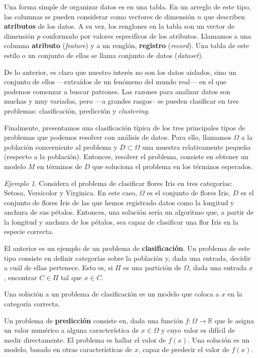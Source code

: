 \documentclass{article}
\numberwithin{equation}{section}
\theoremstyle{remark}
\newtheorem{example}{Ejemplo}
\theoremstyle{definition}
\theoremstyle{remark}
\theoremstyle{remark}
\begin{document}
Una forma simple de organizar datos es en una tabla. En un arreglo de este tipo, las columnas
se pueden considerar como vectores de dimensión $n$ que
describen \textbf{atributos} de los datos. A su vez, los renglones en la tabla 
son un vector de dimensión $p$ conformado por valores especifícos de los atributos. 
Llamamos a una columna \textbf{atributo} (\textit{feature}) y a un renglón, \textbf{registro} (\textit{record}). 
Una tabla de este estilo o un conjunto de ellas se llama conjunto de datos (\textit{dataset}).

De lo anterior, es claro que nuestro interés no son los datos aislados, sino un conjunto de ellos ---extraídos de un
fenómeno del mundo real--- en el que podemos comenzar a buscar patrones. 
Las razones para analizar datos son muchas y muy variadas, pero ---a grandes rasgos-- se pueden clasificar en tres
problemas: clasificación, predicción y \textit{clustering}.

Finalmente, presentamos una clasificación típica de los tres principales tipos de problemas que podemos resolver
con análisis de datos.
Para ello, llamamos $\Omega$ a la población concerniente 
al problema y $D \subset \Omega$ una muestra relativamente pequeña (respecto a la población).
Entonces, resolver el problema, consiste
en obtener un modelo $M$ en términos de $D$ que soluciona el problema en los 
términos esperados.

\begin{example}
Considera el problema de clasificar flores Iris en tres categorías: Setosa, Versicolor y Virginica.
En este caso, $\Omega$ es el conjunto de flores Iris, $D$ es el conjunto de flores Iris de las que hemos registrado
datos como la longitud y anchura de sus pétalos.
Entonces, una solución sería un algoritmo que, a partir de la longitud y anchura de los pétalos, sea capaz de clasificar una flor Iris en 
la especie correcta.
\end{example}

El anterior es un ejemplo de un problema de \textbf{clasificación}. 
Un problema de este tipo consiste en definir categorías sobre la 
población y, dada una entrada, decidir a cuál de ellas pertenece. 
Esto es, si $\Pi$ es una partición de $\Omega$, dada una entrada $x$, encontrar $C \in \Pi$ tal que $x \in C$.

Una solución a un problema de clasificación es un modelo que coloca a $x$ en la categoría correcta.

Un problema de \textbf{predicción} consiste en, dada una función $f: \Omega \to \mathbb{R}$
que le asigna un valor numérico a alguna característica de $x \in \Omega$ y
cuyo valor es difícil de medir directamente. El problema es hallar el valor de $f(x)$. 
Una solución es un modelo, basado en otras características de $x$,
capaz de predecir el valor de $f(x)$.
\end{document}
